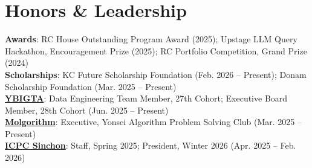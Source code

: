 \documentclass[letterpaper,10pt]{article}
\begin{document}
\section{Honors \& Leadership}
\small{
\textbf{Awards}: RC House Outstanding Program Award (2025); Upstage LLM Query Hackathon, Encouragement Prize (2025); RC Portfolio Competition, Grand Prize (2024) \\
\textbf{Scholarships}: KC Future Scholarship Foundation (Feb. 2026 -- Present); Donam Scholarship Foundation (Mar. 2025 -- Present) \\
\textbf{\href{https://github.com/YBIGTA}{YBIGTA}}: Data Engineering Team Member, 27th Cohort; Executive Board Member, 28th Cohort (Jun. 2025 -- Present) \\
\textbf{\href{https://github.com/yonsei-molgorithm}{Molgorithm}}: Executive, Yonsei Algorithm Problem Solving Club (Mar. 2025 -- Present) \\
\textbf{\href{https://github.com/icpc-sinchon}{ICPC Sinchon}}: Staff, Spring 2025; President, Winter 2026 (Apr. 2025 -- Feb. 2026)
}
\end{document}
